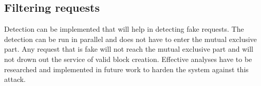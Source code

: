 \subsection{Filtering requests}
Detection can be implemented that will help in detecting fake requests.
The detection can be run in parallel and does not have to enter the mutual exclusive part.
Any request that is fake will not reach the mutual exclusive part
and will not drown out the service of valid block creation.
Effective analyses have to be researched and implemented in future work to harden the system against this attack.

